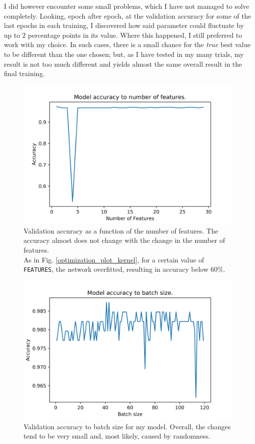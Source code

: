 \documentclass[12pt,a4paper,final]{book}			%
\begin{document}
					I did however encounter some small problems, which I have not  managed to solve completely. Looking, epoch after epoch, at the validation accuracy for some of the last epochs in each training, I discovered how said parameter could fluctuate by up to $2$ percentage points in its value. Where this happened, I still preferred to work with my choice. In such cases, there is a small chance for the \textit{true} best value to be different than the one chosen; but, as I have tested in my many trials, my result is not too much different and yields almost the same overall result in the final training.
					\begin{figure}[h!]
					\centering
			        \includegraphics[scale=0.5]{figures/features.png}
					\caption{Validation accuracy as a function of the number of features. The accuracy almost does not change with the change in the number of features.\\
					As in Fig. \ref{optimization_plot_kernel}, for a certain value of \texttt{FEATURES}, the network overfitted, resulting in accuracy below $60\%$.}
			    \label{optimization_plot_features}					
			    \end{figure}
			    
			    \begin{figure}[h!]
					\centering
			        \includegraphics[scale=0.5]{figures/batches.png}
					\caption{Validation accuracy to batch size for my model. Overall, the changes tend to be very small and, most likely, caused by randomness.}
			    \label{optimization_plot_batch}					
			    \end{figure}
\end{document}
